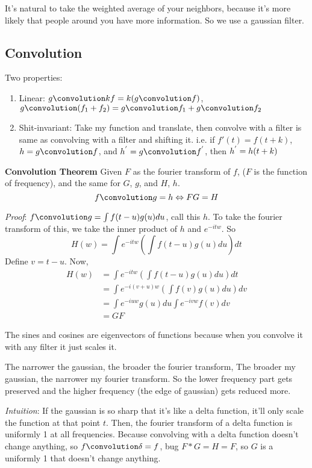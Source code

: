  
It's natural to take the weighted average of your neighbors, because
it's more likely that people around you have more information. So we
use a gaussian filter.

\subsection{Convolution}
\label{sec:convolution}
Two properties:
\begin{enumerate}
\item Linear: $g\conv kf = k(g\conv f)$, $g\conv (f_1 + f_2) = g\conv
  f_1 + g\conv f_2$
\item Shit-invariant: Take my function and translate, then convolve
  with a filter is same as convolving with a filter and shifting
  it. i.e. if $f'(t) = f(t+k)$, $h= g\conv f$, and $h\pri = g \conv
  f\pri$, then $h^{'} = h(t+k)$
\end{enumerate}

\textbf{Convolution Theorem}
Given $F$ as the fourier transform of $f$, ($F$ is the function of
frequency), and the same for $G$, $g$, and $H$, $h$.
\begin{equation}
  \label{eq:12}
f\conv g = h \lrarr FG = H  
\end{equation}

\emph{Proof}: $f\conv g = \int f(t-u)g(u)du$, call this $h$. To take
the fourier transform of this, we take the inner product of $h$ and
$e^{-itw}$.
So $$H(w) = \int e^{-itw} (\int f(t-u)g(u)du) dt$$
Define $v = t-u$. Now, 
\begin{align*}
  H(w) &= \int e^{-itw} (\int f(t-u)g(u)du) dt\\
&= \int e^{-i(v+u)w} (\int f(v)g(u)du) dv\\
&= \int e^{-iuw} g(u)du \int e^{-ivw}  f(v) dv\\
&= GF
\end{align*}

The sines and cosines are eigenvectors of functions because when you
convolve it with any filter it just scales it. 

The narrower the gaussian, the broader the fourier transform, The
broader my gaussian, the narrower my fourier transform. So the
lower frequency part gets preserved and the higher frequency (the edge
of gaussian) gets reduced more. 

\emph{Intuition}:
If the gaussian is so sharp that it's like a delta function, it'll
only scale the function at that point $t$. Then, the fourier transform of a delta function is uniformly 1 at all
frequencies. Because convolving with a delta function doesn't change
anything, so $f\conv \delta = f$, bug $F*G = H = F$, so $G$ is a
uniformly 1 that doesn't change anything.

